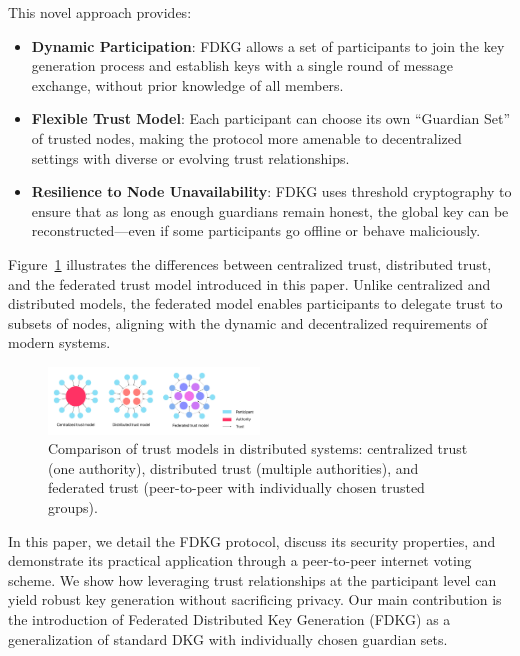 \documentclass[lettersize,journal]{IEEEtran}
\theoremstyle{definition}
\begin{document}
This novel approach provides:
\begin{itemize}
    \item \textbf{Dynamic Participation}: FDKG allows a set of participants to join the key generation process and establish keys with a single round of message exchange, without prior knowledge of all members.
    
    \item \textbf{Flexible Trust Model}: Each participant can choose its own ``Guardian Set'' of trusted nodes, making the protocol more amenable to decentralized settings with diverse or evolving trust relationships.

    \item \textbf{Resilience to Node Unavailability}: FDKG uses threshold cryptography to ensure that as long as enough guardians remain honest, the global key can be reconstructed—even if some participants go offline or behave maliciously.
\end{itemize}

Figure~\ref{fig:trust-models} illustrates the differences between centralized trust, distributed trust, and the federated trust model introduced in this paper. Unlike centralized and distributed models, the federated model enables participants to delegate trust to subsets of nodes, aligning with the dynamic and decentralized requirements of modern systems.

\begin{figure}
    \centering
    \includegraphics[width=0.5\textwidth]{federated_trust_model.pdf}
    \caption{Comparison of trust models in distributed systems: centralized trust (one authority), distributed trust (multiple authorities), and federated trust (peer-to-peer with individually chosen trusted groups).}
    \label{fig:trust-models}
\end{figure}

In this paper, we detail the FDKG protocol, discuss its security properties, and demonstrate its practical application through a peer-to-peer internet voting scheme. We show how leveraging trust relationships at the participant level can yield robust key generation without sacrificing privacy. Our main contribution is the introduction of Federated Distributed Key Generation (FDKG) as a generalization of standard DKG with individually chosen guardian sets.
\end{document}
